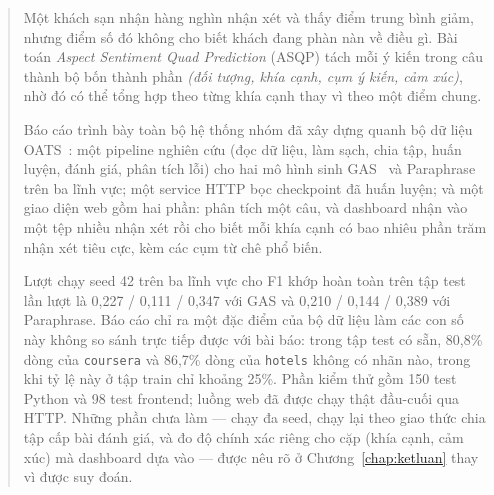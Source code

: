 \documentclass[12pt,a4paper]{report}
\newcommand{\code}[1]{\texttt{#1}}
\begin{document}
\begin{abstract}
Một khách sạn nhận hàng nghìn nhận xét và thấy điểm trung bình giảm, nhưng điểm số đó không cho biết khách đang phàn nàn
về điều gì. Bài toán \textit{Aspect Sentiment Quad Prediction} (ASQP) tách mỗi ý kiến trong câu thành bộ bốn thành phần
\emph{(đối tượng, khía cạnh, cụm ý kiến, cảm xúc)}, nhờ đó có thể tổng hợp theo từng khía cạnh thay vì theo một điểm chung.

Báo cáo trình bày toàn bộ hệ thống nhóm đã xây dựng quanh bộ dữ liệu OATS~\cite{oats2024}: một pipeline nghiên cứu
(đọc dữ liệu, làm sạch, chia tập, huấn luyện, đánh giá, phân tích lỗi) cho hai mô hình sinh GAS~\cite{gas2021} và
Paraphrase~\cite{paraphrase2021} trên ba lĩnh vực; một service HTTP bọc checkpoint đã huấn luyện; và một giao diện web
gồm hai phần: phân tích một câu, và dashboard nhận vào một tệp nhiều nhận xét rồi cho biết mỗi khía cạnh có bao nhiêu
phần trăm nhận xét tiêu cực, kèm các cụm từ chê phổ biến.

Lượt chạy seed 42 trên ba lĩnh vực cho F1 khớp hoàn toàn trên tập test lần lượt là 0{,}227 / 0{,}111 / 0{,}347 với GAS và
0{,}210 / 0{,}144 / 0{,}389 với Paraphrase. Báo cáo chỉ ra một đặc điểm của bộ dữ liệu làm các con số này không so sánh
trực tiếp được với bài báo: trong tập test có sẵn, 80{,}8\% dòng của \code{coursera} và 86{,}7\% dòng của \code{hotels}
không có nhãn nào, trong khi tỷ lệ này ở tập train chỉ khoảng 25\%. Phần kiểm thử gồm 150 test Python và 98 test
frontend; luồng web đã được chạy thật đầu-cuối qua HTTP. Những phần chưa làm --- chạy đa seed, chạy lại theo giao thức
chia tập cấp bài đánh giá, và đo độ chính xác riêng cho cặp (khía cạnh, cảm xúc) mà dashboard dựa vào --- được nêu rõ ở
Chương~\ref{chap:ketluan} thay vì được suy đoán.
\end{abstract}
\end{document}
